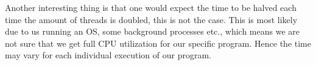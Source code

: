 Another interesting thing is that one would expect the time to be halved each time the amount of threads is doubled, this is not the case. This is most likely due to us running an OS, some background processes etc., which means we are not sure that we get full CPU utilization for our specific program. Hence the time may vary for each individual execution of our program.